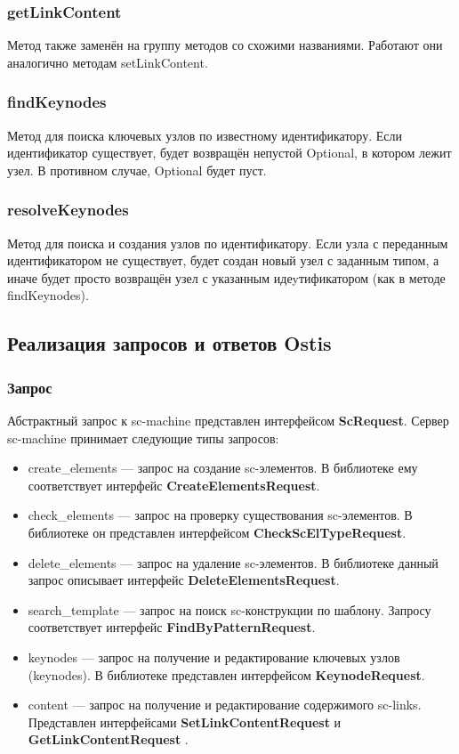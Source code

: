 \subsubsection{getLinkContent}
Метод также заменён на группу методов со схожими названиями. Работают они аналогично методам setLinkContent. 

\subsubsection{findKeynodes}
Метод для поиска ключевых узлов по известному идентификатору. Если идентификатор существует, будет возвращён непустой Optional, в котором лежит узел. В противном случае, Optional будет пуст. 

\subsubsection{resolveKeynodes}
Метод для поиска и создания узлов по идентификатору. Если узла с переданным идентификатором не существует, будет создан новый узел с заданным типом, а иначе будет просто возвращён узел с указанным идеyтификатором (как в методе findKeynodes).

\subsection{Реализация запросов и ответов Ostis}

\subsubsection{Запрос}
Абстрактный запрос к sc-machine представлен интерфейсом \textbf{ScRequest}. Сервер sc-machine принимает следующие типы запросов: 
\begin{itemize}
\item create\_elements --- запрос на создание sc-элементов. В библиотеке ему соответствует интерфейс \textbf{CreateElementsRequest}. 
\item check\_elements --- запрос на проверку существования sc-элементов. В библиотеке он представлен интерфейсом \textbf{CheckScElTypeRequest}.
\item delete\_elements --- запрос на удаление sc-элементов. В библиотеке данный запрос описывает интерфейс \textbf{DeleteElementsRequest}.
\item search\_template --- запрос на поиск sc-конструкции по шаблону. Запросу соответствует интерфейс \textbf{FindByPatternRequest}.
\item keynodes --- запрос на получение и редактирование ключевых узлов (keynodes). В библиотеке представлен интерфейсом \textbf{KeynodeRequest}.
\item content --- запрос на получение и редактирование содержимого sc-links. Представлен интерфейсами \textbf{SetLinkContentRequest} и \textbf{GetLinkContentRequest} .
\end{itemize}

